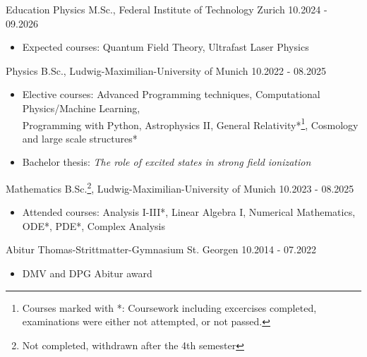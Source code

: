 \documentclass{resume}
\begin{document}
\begin{rSection}{Education}
    Physics M.Sc., Federal Institute of Technology Zurich \hfill 10.2024 - 09.2026
    \begin{itemize}\footnotesize
        \item Expected courses: Quantum Field Theory, Ultrafast Laser Physics
    \end{itemize}

    Physics B.Sc., Ludwig-Maximilian-University of Munich \hfill 10.2022 - 08.2025
    \begin{itemize}\footnotesize
        \item Elective courses: Advanced Programming techniques, Computational Physics/Machine Learning,\\Programming with Python, Astrophysics II, General Relativity*\footnote{Courses marked with *: Coursework including excercises completed, examinations were either not attempted, or not passed.}, Cosmology and large scale structures*
        \item Bachelor thesis: \textit{The role of excited states in strong field ionization}
    \end{itemize}

    Mathematics B.Sc.\footnote{Not completed, withdrawn after the 4th semester}, Ludwig-Maximilian-University of Munich \hfill 10.2023 - 08.2025
    \begin{itemize}\footnotesize
        \item Attended courses: Analysis I-III*, Linear Algebra I, Numerical Mathematics, \\ODE*, PDE*, Complex Analysis
    \end{itemize}

    Abitur Thomas-Strittmatter-Gymnasium St. Georgen \hfill 10.2014 - 07.2022
    \begin{itemize}\footnotesize
        \item DMV and DPG Abitur award
    \end{itemize}

\end{rSection}
\end{document}
